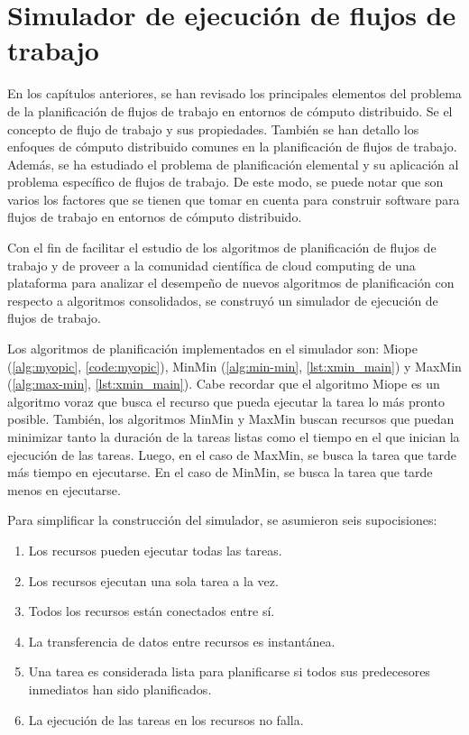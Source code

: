 \chapter[Simulador]{Simulador de ejecución de flujos de trabajo}

En los capítulos anteriores, se han revisado los principales elementos del problema de la planificación de flujos de trabajo en entornos de cómputo distribuido. Se el concepto de flujo de trabajo y sus propiedades. También se han detallo los enfoques de cómputo distribuido comunes en la planificación de flujos de trabajo. Además, se ha estudiado el problema de planificación elemental y su aplicación al problema específico de flujos de trabajo. De este modo, se puede notar que son varios los factores que se tienen que tomar en cuenta para construir software para flujos de trabajo en entornos de cómputo distribuido.

Con el fin de facilitar el estudio de los algoritmos de planificación de flujos de trabajo y de proveer a la comunidad científica de cloud computing de una plataforma para analizar el desempeño de nuevos algoritmos de planificación con respecto a algoritmos consolidados, se construyó un simulador de ejecución de flujos de trabajo.

Los algoritmos de planificación implementados en el simulador son: Miope (\ref{alg:myopic}, \ref{code:myopic}), MinMin (\ref{alg:min-min}, \ref{lst:xmin_main}) y MaxMin (\ref{alg:max-min}, \ref{lst:xmin_main}). Cabe recordar que el algoritmo Miope es un algoritmo voraz que busca el recurso que pueda ejecutar la tarea lo más pronto posible. También, los algoritmos MinMin y MaxMin buscan recursos que puedan minimizar tanto la duración de la tareas listas como el tiempo en el que inician la ejecución de las tareas. Luego, en el caso de MaxMin, se busca la tarea que tarde más tiempo en ejecutarse. En el caso de MinMin, se busca la tarea que tarde menos en ejecutarse.

Para simplificar la construcción del simulador, se asumieron seis supocisiones:

\begin{enumerate}
\item Los recursos pueden ejecutar todas las tareas.
\item Los recursos ejecutan una sola tarea a la vez.
\item Todos los recursos están conectados entre sí.
\item La transferencia de datos entre recursos es instantánea.
\item Una tarea es considerada lista para planificarse si todos sus predecesores inmediatos han sido planificados.
\item La ejecución de las tareas en los recursos no falla.
\end{enumerate}

